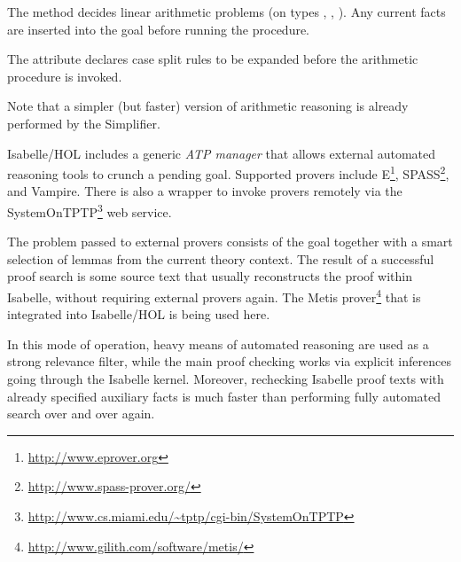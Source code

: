 \begin{isabellebody}
\begin{isamarkuptext}
  The \hyperlink{method.HOL.arith}{\mbox{}} method decides linear arithmetic problems
  (on types , , ).  Any current
  facts are inserted into the goal before running the procedure.

  The \hyperlink{attribute.HOL.arith-split}{\mbox{}} attribute declares case split
  rules to be expanded before the arithmetic procedure is invoked.

  Note that a simpler (but faster) version of arithmetic reasoning is
  already performed by the Simplifier.%
\end{isamarkuptext}%
\isamarkuptrue%
%
\isamarkuptrue%
%
\begin{isamarkuptext}%
Isabelle/HOL includes a generic \emph{ATP manager} that allows
  external automated reasoning tools to crunch a pending goal.
  Supported provers include E\footnote{\url{http://www.eprover.org}},
  SPASS\footnote{\url{http://www.spass-prover.org/}}, and Vampire.
  There is also a wrapper to invoke provers remotely via the
  SystemOnTPTP\footnote{\url{http://www.cs.miami.edu/~tptp/cgi-bin/SystemOnTPTP}}
  web service.

  The problem passed to external provers consists of the goal together
  with a smart selection of lemmas from the current theory context.
  The result of a successful proof search is some source text that
  usually reconstructs the proof within Isabelle, without requiring
  external provers again.  The Metis
  prover\footnote{\url{http://www.gilith.com/software/metis/}} that is
  integrated into Isabelle/HOL is being used here.

  In this mode of operation, heavy means of automated reasoning are
  used as a strong relevance filter, while the main proof checking
  works via explicit inferences going through the Isabelle kernel.
  Moreover, rechecking Isabelle proof texts with already specified
  auxiliary facts is much faster than performing fully automated
  search over and over again.


\end{isamarkuptext}
\end{isabellebody}
